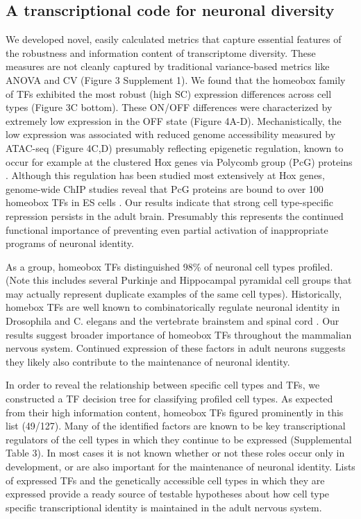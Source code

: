 \subsection{A transcriptional code for neuronal diversity}
We developed novel, easily calculated metrics that capture essential features of the robustness and information content of transcriptome diversity. These measures are not cleanly captured by traditional variance-based metrics like ANOVA and CV (Figure 3 Supplement 1). We found that the homeobox family of TFs exhibited the most robust (high SC) expression differences across cell types (Figure 3C bottom). These ON/OFF differences were characterized by extremely low expression in the OFF state (Figure 4A-D). Mechanistically, the low expression was associated with reduced genome accessibility measured by ATAC-seq (Figure 4C,D) presumably reflecting epigenetic regulation, known to occur for example at the clustered Hox genes via Polycomb group (PcG) proteins \citep{Montavon_2014}. Although this regulation has been studied most extensively at Hox genes, genome-wide ChIP studies reveal that PcG proteins are bound to over 100 homeobox TFs in ES cells \citep{Boyer_2006}. Our results indicate that strong cell type-specific repression persists in the adult brain. Presumably this represents the continued functional importance of preventing even partial activation of inappropriate programs of neuronal identity. 

As a group, homeobox TFs distinguished 98\% of neuronal cell types profiled. (Note this includes several Purkinje and Hippocampal pyramidal cell groups that may actually represent duplicate examples of the same cell types). Historically, homebox TFs are well known to combinatorically regulate neuronal identity in Drosophila and C. elegans \citep{Kratsios_2017} and the vertebrate brainstem and spinal cord \citep{Dasen_2009,Philippidou_2013}. Our results suggest broader importance of homeobox TFs throughout the mammalian nervous system. Continued expression of these factors in adult neurons suggests they likely also contribute to the maintenance of neuronal identity.

In order to reveal the relationship between specific cell types and TFs, we constructed a TF decision tree for classifying profiled cell types. As expected from their high information content, homeobox TFs figured prominently in this list (49/127). Many of the identified factors are known to be key transcriptional regulators of the cell types in which they continue to be expressed (Supplemental Table 3). In most cases it is not known whether or not these roles occur only in development, or are also important for the maintenance of neuronal identity. Lists of expressed TFs and the genetically accessible cell types in which they are expressed provide a ready source of testable hypotheses about how cell type specific transcriptional identity is maintained in the adult nervous system.

